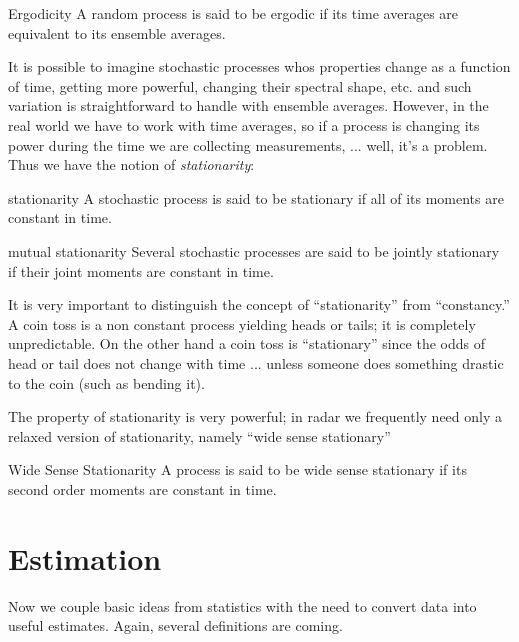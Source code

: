 \begin{definition}{Ergodicity}
A random process is said to be ergodic if its time averages are
equivalent to its ensemble averages.
\end{definition}

It is possible to imagine stochastic processes whos properties change
as a function of time, getting more powerful, changing their spectral
shape, etc. and such variation is straightforward to handle with
ensemble averages.  However, in the real world we have to work with
time averages, so if a process is changing its power during the time
we are collecting measurements, ... well, it's a problem.  Thus we
have the notion of \textit{stationarity}:
\begin{definition}{stationarity}
A stochastic process is said to be stationary if all of its moments
are constant in time.
\end{definition}
\begin{definition}{mutual stationarity}
Several stochastic processes are said to be jointly stationary if
their joint moments are constant in time.
\end{definition}

It is very important to distinguish the concept of ``stationarity''
from ``constancy.''  A coin toss is a non constant process yielding
heads or tails; it is completely unpredictable.  On the other hand a
coin toss is ``stationary'' since the odds of head or tail does not
change with time ... unless someone does something drastic to the coin 
(such as bending it).

The property of stationarity is very powerful; in radar we frequently
need only a relaxed version of stationarity, namely ``wide sense
stationary''
\begin{definition}{Wide Sense Stationarity} A process is said to be
wide sense stationary if its second order moments are constant in
time.
\end{definition}

\section{Estimation}

Now we couple basic ideas from statistics with the need to convert
data into useful estimates.  Again, several definitions are coming.

